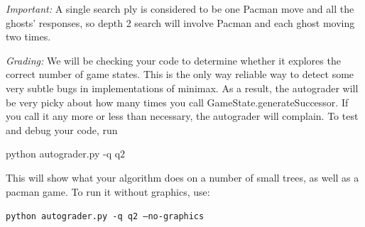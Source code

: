 \documentclass[a4paper, 11pt]{article}
\begin{document}
\textit{Important:} A single search ply is considered to be one Pacman move and all the ghosts' responses, so depth 2 search will involve Pacman and each ghost moving two times.

\textit{Grading:} We will be checking your code to determine whether it explores the correct number of game states. This is the only way reliable way to detect some very subtle bugs in implementations of minimax. As a result, the autograder will be very picky about how many times you call GameState.generateSuccessor. If you call it any more or less than necessary, the autograder will complain. To test and debug your code, run

\textsf{python autograder.py -q q2}

This will show what your algorithm does on a number of small trees, as well as a pacman game. To run it without graphics, use:

\texttt{python autograder.py -q q2 --no-graphics}
\end{document}
